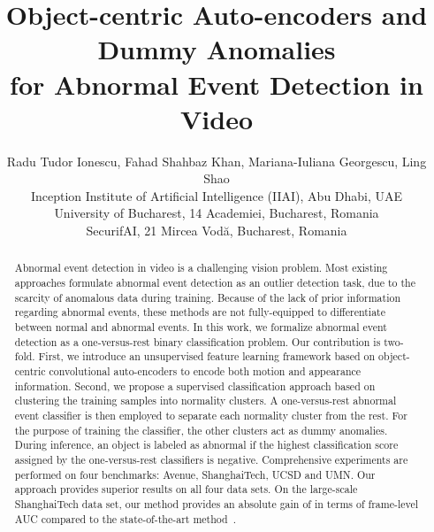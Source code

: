 \documentclass[10pt,twocolumn,letterpaper]{article}
\begin{document}

\title{Object-centric Auto-encoders and Dummy Anomalies\\
for Abnormal Event Detection in Video\vspace*{-0.3cm}}

\author{Radu Tudor Ionescu, Fahad Shahbaz Khan, Mariana-Iuliana Georgescu, Ling Shao\\
Inception Institute of Artificial Intelligence (IIAI), Abu Dhabi, UAE\\
University of Bucharest, 14 Academiei, Bucharest, Romania\\
SecurifAI, 21 Mircea Vod\u{a}, Bucharest, Romania\vspace*{-0.3cm}
}

\maketitle


\begin{abstract}
\vspace*{-0.35cm}
Abnormal event detection in video is a challenging vision problem. Most existing approaches formulate abnormal event detection as an outlier detection task, due to the scarcity of anomalous data during training. Because of the lack of prior information regarding abnormal events, these methods are not fully-equipped to differentiate between normal and abnormal events. In this work, we formalize abnormal event detection as a one-versus-rest binary classification problem. Our contribution is two-fold. First, we introduce an unsupervised feature learning framework based on object-centric convolutional auto-encoders to encode both motion and appearance information. Second, we propose a supervised classification approach based on clustering the training samples into normality clusters. A one-versus-rest abnormal event classifier is then employed to separate each normality cluster from the rest. For the purpose of training the classifier, the other clusters act as dummy anomalies. During inference, an object is labeled as abnormal if the highest classification score assigned by the one-versus-rest classifiers is negative. Comprehensive experiments are performed on four benchmarks: Avenue, ShanghaiTech, UCSD and UMN. Our approach provides superior results on all four data sets. On the large-scale ShanghaiTech data set, our method provides an absolute gain of  in terms of frame-level AUC compared to the state-of-the-art method~\cite{Sultani-CVPR-2018}.
\end{abstract}
\end{document}
